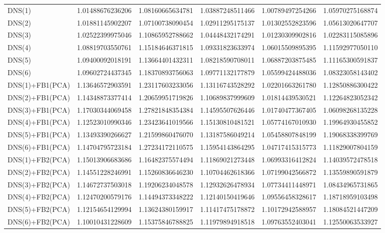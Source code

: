 \begin{table}[H]
\begin{adjustbox}{totalheight=\baselineskip}
\begin{tabular}{lSSSSS}
DNS(1) & 1.01488676236206 & 1.08160665634781 & 1.03887248511466 & 1.00789497254266 & 1.05970275168874 \\ 
DNS(2) & 1.01881145902207 & 1.07100738090454 & 1.02911295175137 & 1.01302552823596 & 1.05613020647707 \\ 
DNS(3) & 1.02522399975046 & 1.10865952788662 & 1.04448432174291 & 1.01230309902816 & 1.02283115085896 \\ 
DNS(4) & 1.08819703550761 & 1.15184646371815 & 1.09331823633974 & 1.06015509895395 & 1.11592977050110 \\ 
DNS(5) & 1.09400092018191 & 1.13664401432311 & 1.08218590708011 & 1.06887203875485 & 1.11165300591837 \\ 
DNS(6) & 1.09602724437345 & 1.18370893756063 & 1.09771132177879 & 1.05599424488036 & 1.08323058143402 \\ 
DNS(1)+FB1(PCA) & 1.13646572903591 & 1.23117603233056 & 1.13116743528292 & 1.02201663261780 & 1.12850886300422 \\ 
DNS(2)+FB1(PCA) & 1.14348873377414 & 1.20659951719826 & 1.10689837999609 & 1.01814439530521 & 1.12264823052342 \\ 
DNS(3)+FB1(PCA) & 1.17030344069458 & 1.27821848354384 & 1.14595507626446 & 1.01740477367405 & 1.06098268135228 \\ 
DNS(4)+FB1(PCA) & 1.12523010990346 & 1.23423641019566 & 1.15130810481521 & 1.05774167010930 & 1.19964930455852 \\ 
DNS(5)+FB1(PCA) & 1.13493390266627 & 1.21599860476070 & 1.13187586049214 & 1.05458807848199 & 1.19068338399769 \\ 
DNS(6)+FB1(PCA) & 1.14704795723184 & 1.27234172110575 & 1.15954143864295 & 1.04717415315773 & 1.11829007804159 \\ 
DNS(1)+FB2(PCA) & 1.15013906683686 & 1.16482375574494 & 1.11869021273448 & 1.06993316412824 & 1.14039572478518 \\ 
DNS(2)+FB2(PCA) & 1.14551228246991 & 1.15260836646230 & 1.10704462618366 & 1.07199042566872 & 1.13559890591879 \\ 
DNS(3)+FB2(PCA) & 1.14672737503018 & 1.19206234048578 & 1.12932626478934 & 1.07734411448971 & 1.08434965731865 \\ 
DNS(4)+FB2(PCA) & 1.12470200579176 & 1.14494373348222 & 1.12140150419646 & 1.09556458328617 & 1.18718959103498 \\ 
DNS(5)+FB2(PCA) & 1.12154654129994 & 1.13624380159917 & 1.11417475178872 & 1.10172942588957 & 1.18084521447209 \\ 
DNS(6)+FB2(PCA) & 1.10010431228609 & 1.15375846788825 & 1.11979894918518 & 1.09763552403041 & 1.12550063533927 \\ 

\end{tabular}
\end{adjustbox}
\end{table}
